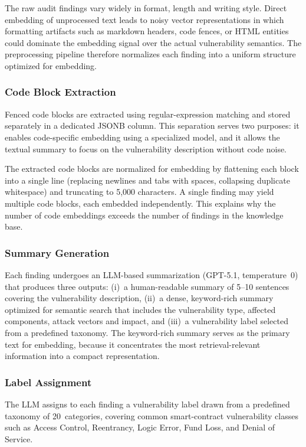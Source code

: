 The raw audit findings vary widely in format, length and writing style. Direct embedding of unprocessed text leads to noisy vector representations in which formatting artifacts such as markdown headers, code fences, or HTML entities could dominate the embedding signal over the actual vulnerability semantics. The preprocessing pipeline therefore normalizes each finding into a uniform structure optimized for embedding.

\subsubsection*{Code Block Extraction}
Fenced code blocks are extracted using regular-expression matching and stored separately in a dedicated JSONB column. This separation serves two purposes: it enables code-specific embedding using a specialized model, and it allows the textual summary to focus on the vulnerability description without code noise.

The extracted code blocks are normalized for embedding by flattening each block into a single line (replacing newlines and tabs with spaces, collapsing duplicate whitespace) and truncating to 5{,}000 characters. A single finding may yield multiple code blocks, each embedded independently. This explains why the number of code embeddings exceeds the number of findings in the knowledge base.

\subsubsection*{Summary Generation}
Each finding undergoes an LLM-based summarization (GPT-5.1, temperature~0) that produces three outputs: (i)~a human-readable summary of 5--10 sentences covering the vulnerability description, (ii)~a dense, keyword-rich summary optimized for semantic search that includes the vulnerability type, affected components, attack vectors and impact, and (iii)~a vulnerability label selected from a predefined taxonomy. The keyword-rich summary serves as the primary text for embedding, because it concentrates the most retrieval-relevant information into a compact representation.

\subsubsection*{Label Assignment}
The LLM assigns to each finding a vulnerability label drawn from a predefined taxonomy of 20~categories, covering common smart-contract vulnerability classes such as Access Control, Reentrancy, Logic Error, Fund Loss, and Denial of Service.


